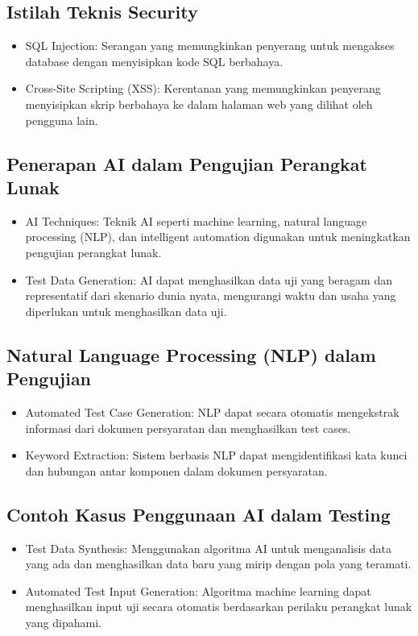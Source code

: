 \documentclass{article}
\begin{document}
\subsection{Istilah Teknis Security}
\begin{itemize}
    \item SQL Injection: Serangan yang memungkinkan penyerang untuk mengakses database dengan menyisipkan kode SQL berbahaya.
    \item Cross-Site Scripting (XSS): Kerentanan yang memungkinkan penyerang menyisipkan skrip berbahaya ke dalam halaman web yang dilihat oleh pengguna lain.
\end{itemize}

\subsection{Penerapan AI dalam Pengujian Perangkat Lunak}
\begin{itemize}
    \item AI Techniques: Teknik AI seperti machine learning, natural language processing (NLP), dan intelligent automation digunakan untuk meningkatkan pengujian perangkat lunak.
    \item Test Data Generation: AI dapat menghasilkan data uji yang beragam dan representatif dari skenario dunia nyata, mengurangi waktu dan usaha yang diperlukan untuk menghasilkan data uji.
\end{itemize}

\subsection{Natural Language Processing (NLP) dalam Pengujian}
\begin{itemize}
    \item Automated Test Case Generation: NLP dapat secara otomatis mengekstrak informasi dari dokumen persyaratan dan menghasilkan test cases.
    \item Keyword Extraction: Sistem berbasis NLP dapat mengidentifikasi kata kunci dan hubungan antar komponen dalam dokumen persyaratan.
\end{itemize}

\subsection{Contoh Kasus Penggunaan AI dalam Testing}
\begin{itemize}
    \item Test Data Synthesis: Menggunakan algoritma AI untuk menganalisis data yang ada dan menghasilkan data baru yang mirip dengan pola yang teramati.
    \item Automated Test Input Generation: Algoritma machine learning dapat menghasilkan input uji secara otomatis berdasarkan perilaku perangkat lunak yang dipahami.
\end{itemize}
\end{document}
